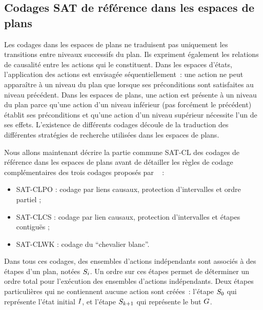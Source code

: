 %
%
\subsection{Codages SAT de référence dans les espaces de plans}

Les codages dans les espaces de plans ne traduisent pas uniquement les transitions entre niveaux successifs du plan. Ils expriment également les relations de causalité entre les actions qui le constituent. Dans les espaces d'états, l'application des actions est envisagée séquentiellement~: une action ne peut apparaître à un niveau du plan que lorsque ses préconditions sont satisfaites au niveau précédent.  Dans les espaces de plans, une action est présente à un niveau du plan parce qu'une action d'un niveau inférieur (pas forcément le précédent) établit ses préconditions et qu'une action d'un niveau supérieur nécessite l'un de ses effets.
L'existence de différents codages découle de la traduction des différentes stratégies de recherche utilisées dans les espaces de plans. %

Nous allons maintenant décrire la partie commune SAT-CL des codages de référence dans les espaces de plans avant de détailler les règles de codage complémentaires des trois codages proposés par ~\cite{MK99} :
\begin{itemize}
    \item SAT-CLPO : codage par liens causaux, protection d'intervalles et ordre partiel ;
    \item SAT-CLCS : codage par lien causaux, protection d'intervalles et étapes contiguës ;
    \item SAT-CLWK : codage du \enquote{chevalier blanc}.
\end{itemize}

Dans tous ces codages, des ensembles d'actions indépendants sont associés à des étapes d'un plan, notées $S_{i}$. Un ordre sur ces étapes permet de déterminer un ordre total pour l'exécution des ensembles d'actions indépendants.
Deux étapes particulières qui ne contiennent aucune action sont créées~: l'étape $S_{0}$ qui représente l'état initial $I$, et l'étape $S_{k+1}$ qui représente le but $G$.


